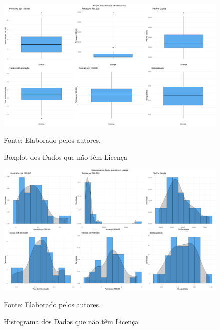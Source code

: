 \documentclass[12pt]{article}
\begin{document}
\begin{figure}[H]
    \centering
    \caption{Boxplot dos Dados que não têm Licença}
    \includegraphics[width=1.0\textwidth]{Boxplot dos Dados que não tem Licença.png}
    \label{fig:Boxplot dos Dados que não tem Licença}
    
    \footnotesize{Fonte: Elaborado pelos autores.}
\end{figure}

\begin{figure}[H]
    \centering
    \caption{Histograma dos Dados que não têm Licença}
    \includegraphics[width=1.0\textwidth]{Histograma dos Dados que não tem Licença.png}
    \label{fig:Histograma dos Dados que não tem Licença}
    
    \footnotesize{Fonte: Elaborado pelos autores.}
\end{figure}
\end{document}
